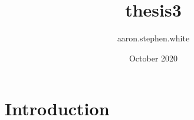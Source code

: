 \documentclass{article}
\title{thesis3}
\author{aaron.stephen.white }
\date{October 2020}
\begin{document}
\maketitle

\section{Introduction}
\end{document}
